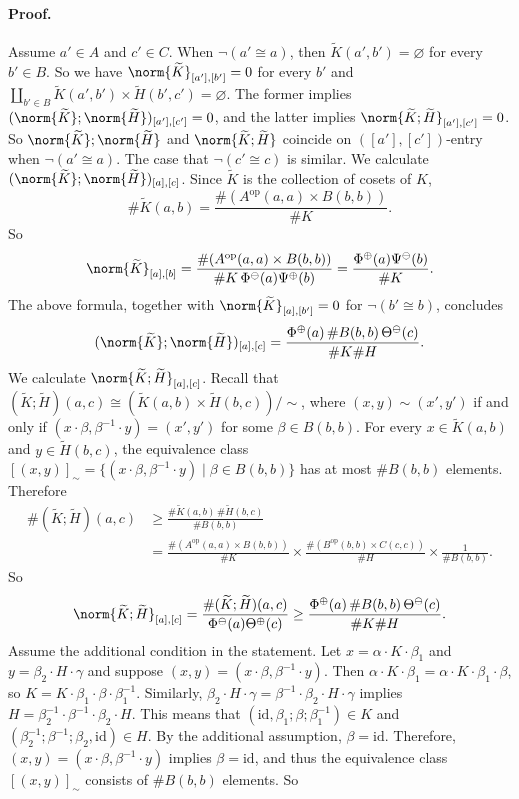 \paragraph{Proof.} Assume $a'\in A$ and $c'\in C$. When $\neg(a'\cong a)$, then $\widetilde K(a',b')=\varnothing$ for every $b'\in B$. So we have $\norm{\widetilde K}_{[a'],[b']}=0$ for every $b'$ and $\coprod_{b'\in B}\widetilde K(a',b')\times\widetilde H(b',c')=\varnothing$. The former implies $(\norm{\widetilde K};\norm{\widetilde H})_{[a'],[c']}=0$, and the latter implies $\norm{\widetilde K;\widetilde H}_{[a'],[c']}=0$. So $\norm{\widetilde K};\norm{\widetilde H}$ and $\norm{\widetilde K;\widetilde H}$ coincide on $([a'],[c'])$-entry when $\neg(a'\cong a)$. The case that $\neg(c'\cong c)$ is similar.
We calculate $(\norm{\widetilde K};\norm{\widetilde H})_{[a],[c]}$. Since $\widetilde K$ is the collection of cosets of $K$,
\[
\#\widetilde K(a,b)=\frac{\#(A^{\mathrm{op}}(a,a)\times B(b,b))}{\#K}.
\]
So
\[
\norm{\widetilde K}_{[a],[b]}=
\frac{\#(A^{\mathrm{op}}(a,a)\times B(b,b))}{\#K\,\Phi^\ominus(a)\Psi^\oplus(b)}
=\frac{\Phi^\oplus(a)\Psi^\ominus(b)}{\#K}.
\]
The above formula, together with $\norm{\widetilde K}_{[a],[b']}=0$ for $\neg(b'\cong b)$, concludes
\[
(\norm{\widetilde K};\norm{\widetilde H})_{[a],[c]}
=\frac{\Phi^\oplus(a)\,\#B(b,b)\,\Theta^\ominus(c)}{\#K\#H}.
\]
We calculate $\norm{\widetilde K;\widetilde H}_{[a],[c]}$. Recall that $(\widetilde K;\widetilde H)(a,c)\cong(\widetilde K(a,b)\times\widetilde H(b,c))/{\sim}$, where $(x,y)\sim(x',y')$ if and only if $(x\cdot\beta,\beta^{-1}\cdot y)=(x',y')$ for some $\beta\in B(b,b)$. For every $x\in\widetilde K(a,b)$ and $y\in\widetilde H(b,c)$, the equivalence class $[(x,y)]_\sim=\{(x\cdot\beta,\beta^{-1}\cdot y)\mid\beta\in B(b,b)\}$ has at most $\#B(b,b)$ elements. Therefore
\[
\begin{aligned}
\#(\widetilde K;\widetilde H)(a,c)&\ge\frac{\#\widetilde K(a,b)\,\#\widetilde H(b,c)}{\#B(b,b)}\\
&=\frac{\#(A^{\mathrm{op}}(a,a)\times B(b,b))}{\#K}
 \times\frac{\#(B^{\mathrm{op}}(b,b)\times C(c,c))}{\#H}
 \times\frac1{\#B(b,b)}.
\end{aligned}
\]
So
\[
\norm{\widetilde K;\widetilde H}_{[a],[c]}
=\frac{\#(\widetilde K;\widetilde H)(a,c)}{\Phi^\ominus(a)\Theta^\oplus(c)}
\ge\frac{\Phi^\oplus(a)\,\#B(b,b)\,\Theta^\ominus(c)}{\#K\#H}.
\]
Assume the additional condition in the statement. Let $x=\alpha\cdot K\cdot\beta_1$ and $y=\beta_2\cdot H\cdot\gamma$ and suppose $(x,y)=(x\cdot\beta,\beta^{-1}\cdot y)$. Then $\alpha\cdot K\cdot\beta_1=\alpha\cdot K\cdot\beta_1\cdot\beta$, so $K=K\cdot\beta_1\cdot\beta\cdot\beta_1^{-1}$. Similarly, $\beta_2\cdot H\cdot\gamma=\beta^{-1}\cdot\beta_2\cdot H\cdot\gamma$ implies $H=\beta_2^{-1}\cdot\beta^{-1}\cdot\beta_2\cdot H$. This means that $(\mathrm{id},\beta_1;\beta;\beta_1^{-1})\in K$ and $(\beta_2^{-1};\beta^{-1};\beta_2,\mathrm{id})\in H$. By the additional assumption, $\beta=\mathrm{id}$. Therefore, $(x,y)=(x\cdot\beta,\beta^{-1}\cdot y)$ implies $\beta=\mathrm{id}$, and thus the equivalence class $[(x,y)]_\sim$ consists of $\#B(b,b)$ elements. So
